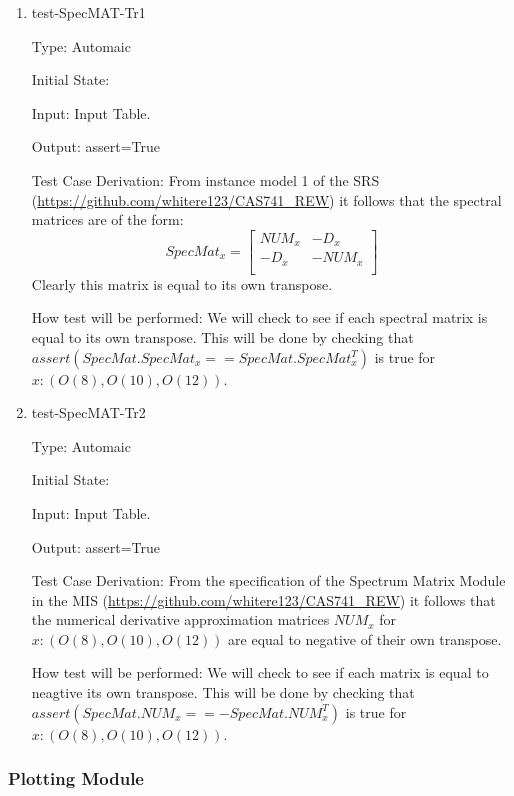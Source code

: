 \documentclass[12pt, titlepage]{article}
\begin{document}
\begin{enumerate}				
	\item{test-SpecMAT-Tr1\\}
	
	Type: Automaic
	
	Initial State: 
	
	Input: Input Table.
	
	Output: assert=True
	
	Test Case Derivation: From instance model 1 of the SRS 
	(\url{https://github.com/whitere123/CAS741_REW}) it follows that 
	the spectral matrices are of the form: 
	 \[
	SpecMat_{x}=
	\left[ {\begin{array}{cc}
		NUM_{x} & -D_{x} \\
		-D_{x} & -NUM_{x} \\
		\end{array} } \right]
	\] 
	Clearly this matrix is equal to its own transpose. 
	
	How test will be performed: We will check to see if each spectral matrix is 
	equal to its own transpose. This will be done by checking that $assert( 
	SpecMat.SpecMat_{x} == SpecMat.SpecMat_{x}^{T} ) $ is true for $x: ( O(8), 
	O(10), O(12) )$.  
	
	\item{test-SpecMAT-Tr2\\}
	
	Type: Automaic
	
	Initial State: 
	
	Input: Input Table.
	
	Output: assert=True
	
	Test Case Derivation: From the specification of the Spectrum Matrix Module 
	in the MIS 
	(\url{https://github.com/whitere123/CAS741_REW}) it follows that 
	the numerical derivative approximation matrices $NUM_{x}$ for 
	$x:(O(8),O(10),O(12))$ are equal to negative of their own transpose.
	
	How test will be performed: We will check to see if each matrix is 
	equal to neagtive its own transpose. This will be done by checking that 
	$assert( 
	SpecMat.NUM_{x} == -SpecMat.NUM_{x}^{T} ) $ is true for $x: ( O(8), 
	O(10), O(12) )$.  
		
\end{enumerate} 

\subsubsection{Plotting Module} 
\end{document}
